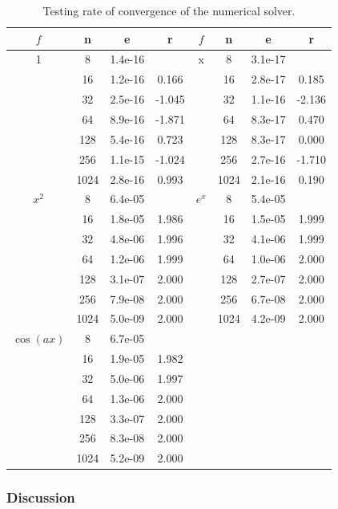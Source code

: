 \documentclass[a4paper, 11pt, notitlepage, english]{article}
\begin{document}
\begin{table}[p]
\centering
    \begin{tabular}{c|c|c|c || c|c|c|c}
    $f$ & n & e & r & $f$ & n & e & r \\ \hline \hline
1 &  8 & 1.4e-16 &   & x  & 8 & 3.1e-17 &  \\ \hline
&   16 & 1.2e-16 &  0.166 & &   16 & 2.8e-17 &  0.185 \\ \hline
&   32 & 2.5e-16 & -1.045 & &   32 & 1.1e-16 & -2.136 \\ \hline
&   64 & 8.9e-16 & -1.871 & &   64 & 8.3e-17 &  0.470 \\ \hline
&  128 & 5.4e-16 &  0.723 & &  128 & 8.3e-17 &  0.000 \\ \hline
&  256 & 1.1e-15 & -1.024 & &  256 & 2.7e-16 & -1.710 \\ \hline
& 1024 & 2.8e-16 &  0.993 & & 1024 & 2.1e-16 &  0.190 \\ \hline \hline
$x^2$& 8 & 6.4e-05 &  &$e^x$&8 & 5.4e-05 &  \\ \hline
&   16 & 1.8e-05 & 1.986 &&   16 & 1.5e-05 & 1.999 \\ \hline
&   32 & 4.8e-06 & 1.996 &&   32 & 4.1e-06 & 1.999 \\ \hline
&   64 & 1.2e-06 & 1.999 &&   64 & 1.0e-06 & 2.000 \\ \hline
&  128 & 3.1e-07 & 2.000 &&  128 & 2.7e-07 & 2.000 \\ \hline
&  256 & 7.9e-08 & 2.000 &&  256 & 6.7e-08 & 2.000 \\ \hline
& 1024 & 5.0e-09 & 2.000 && 1024 & 4.2e-09 & 2.000 \\ \hline \hline
$\cos(ax) $&    8 & 6.7e-05 & & & & & \\ \hline
&   16 & 1.9e-05 & 1.982 & & & & \\ \hline
&   32 & 5.0e-06 & 1.997 & & & & \\ \hline
&   64 & 1.3e-06 & 2.000 & & & & \\ \hline
&  128 & 3.3e-07 & 2.000 & & & & \\ \hline
&  256 & 8.3e-08 & 2.000 & & & & \\ \hline
& 1024 & 5.2e-09 & 2.000 & & & &
    \end{tabular}
    \caption{Testing rate of convergence of the numerical solver.\label{table:f}}
\end{table}


\clearpage

\subsubsection*{Discussion}
\end{document}
